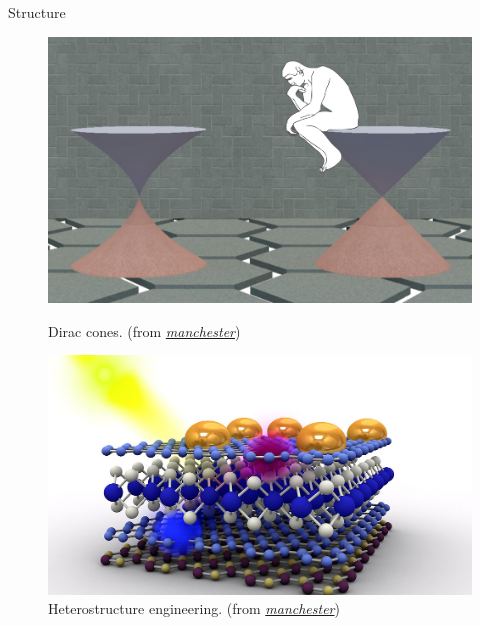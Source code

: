 \documentclass{beamer}
\begin{document}
  \begin{frame}{Structure}
  \begin{figure}
  \centering
  \includegraphics[scale = 0.028]{cones.jpg}
  \caption{Dirac cones. (from 
    \href{http://www.graphene.manchester.ac.uk/}{\emph{manchester}})}
   \includegraphics[scale = 0.135]{18-2D-atomic-crystals-image-library-01_1000x565.jpg}
  \caption{Heterostructure engineering. (from 
    \href{http://www.graphene.manchester.ac.uk/}{\emph{manchester}})}
   \end{figure}
  \end{frame}
  
\end{document}
